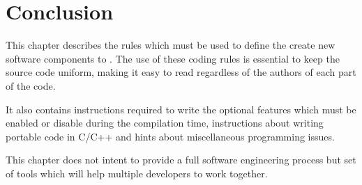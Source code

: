 \section{Conclusion}
\label{sec:coding.conclusion}

This chapter describes the rules which must be used to define the create new software components to \libname. The use of these coding rules is essential to keep the source code uniform, making it easy to read regardless of the authors of each part of the code.

It also contains instructions required to write the optional features which must be enabled or disable during the compilation time, instructions about writing portable code in C/C++ and hints about miscellaneous programming issues.

This chapter does not intent to provide a full software engineering process but set of tools which will help multiple developers to work together.


